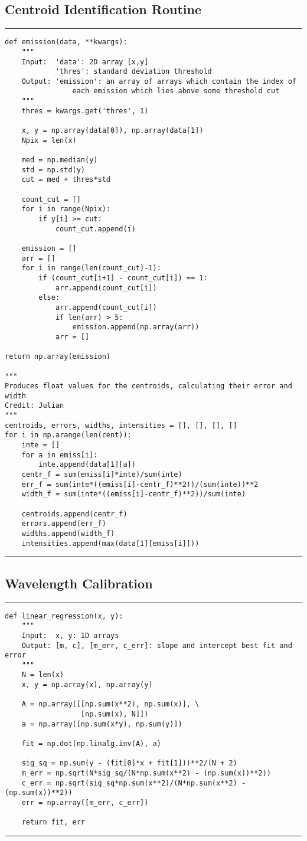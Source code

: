 \documentclass[preprint]{aastex62}
\begin{document}
\subsection{Centroid Identification Routine} \label{code:stats}
\small
\hrule
\begin{lstlisting}
def emission(data, **kwargs):
    """
    Input:  'data': 2D array [x,y]
            'thres': standard deviation threshold
    Output: 'emission': an array of arrays which contain the index of 
                each emission which lies above some threshold cut
    """
    thres = kwargs.get('thres', 1)
    
    x, y = np.array(data[0]), np.array(data[1])
    Npix = len(x)
    
    med = np.median(y)
    std = np.std(y)
    cut = med + thres*std
    
    count_cut = []
    for i in range(Npix):
        if y[i] >= cut:
            count_cut.append(i)
    
    emission = []
    arr = []
    for i in range(len(count_cut)-1):
        if (count_cut[i+1] - count_cut[i]) == 1:
            arr.append(count_cut[i])
        else:
            arr.append(count_cut[i])
            if len(arr) > 5:
                emission.append(np.array(arr))
            arr = []

return np.array(emission)

"""
Produces float values for the centroids, calculating their error and width
Credit: Julian
"""
centroids, errors, widths, intensities = [], [], [], []
for i in np.arange(len(cent)):
    inte = []
    for a in emiss[i]:
        inte.append(data[1][a])
    centr_f = sum(emiss[i]*inte)/sum(inte)
    err_f = sum(inte*((emiss[i]-centr_f)**2))/(sum(inte))**2
    width_f = sum(inte*((emiss[i]-centr_f)**2))/sum(inte)
    
    centroids.append(centr_f)
    errors.append(err_f)
    widths.append(width_f)
    intensities.append(max(data[1][emiss[i]]))
\end{lstlisting}
\hrule \vspace{7pt}


\subsection{Wavelength Calibration} \label{code:stats}
\small
\hrule
\begin{lstlisting}
def linear_regression(x, y):
    """
    Input:  x, y: 1D arrays
    Output: [m, c], [m_err, c_err]: slope and intercept best fit and error
    """
    N = len(x)
    x, y = np.array(x), np.array(y)

    A = np.array([[np.sum(x**2), np.sum(x)], \
                  [np.sum(x), N]])
    a = np.array([np.sum(x*y), np.sum(y)])

    fit = np.dot(np.linalg.inv(A), a)

    sig_sq = np.sum(y - (fit[0]*x + fit[1]))**2/(N + 2)
    m_err = np.sqrt(N*sig_sq/(N*np.sum(x**2) - (np.sum(x))**2))
    c_err = np.sqrt(sig_sq*np.sum(x**2)/(N*np.sum(x**2) - (np.sum(x))**2))
    err = np.array([m_err, c_err])

    return fit, err
\end{lstlisting}
\hrule \vspace{7pt}
\end{document}
